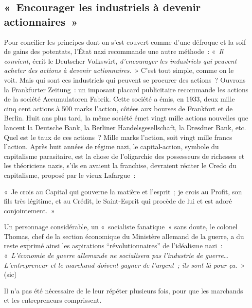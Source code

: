 \documentclass[french,twoside]{book} %
\newenvironment{quoteblock}%
  {\begin{quoting}}
  {\end{quoting}}
\newenvironment{quotebar}{%
    \def\FrameCommand{{\color{rubric!10!}\vrule width 0.5em} \hspace{0.9em}}%
    \def\OuterFrameSep{\itemsep} %
    \MakeFramed {\advance\hsize-\width \FrameRestore}
  }%
  {%
    \endMakeFramed
  }
\renewenvironment{quoteblock}%
  {%
    \savenotes
    \setstretch{0.9}
    \normalfont
    \begin{quotebar}
  }
  {%
    \end{quotebar}
    \spewnotes
  }
\begin{document}
\subsection[« Encourager les industriels à devenir actionnaires »]{« Encourager les industriels à devenir actionnaires »}
\noindent Pour concilier les principes dont on s’est couvert comme d’une défroque et la soif de gains des potentats, l’État nazi recommande une autre méthode : « \emph{Il convient}, écrit le Deutscher Volkswirt, \emph{d’encourager les industriels qui peuvent acheter des actions à devenir actionnaires.} » C’est tout simple, comme on le voit. Mais qui sont ces industriels qui peuvent se procurer des actions ? Ouvrons la Frankfurter Zeitung : un imposant placard publicitaire recommande les actions de la société Accumulatoren Fabrik. Cette société a émis, en 1933, deux mille cinq cent actions à 500 marks l’action, côtées aux bourses de Frankfort et de Berlin. Huit ans plus tard, la même société émet vingt mille actions nouvelles que lancent la Deutsche Bank, la Berliner Handelsgesellschaft, la Dresdner Bank, etc. Quel est le taux de ces actions ? Mille marks l’action, soit vingt mille francs l’action. Après huit années de régime nazi, le capital-action, symbole du capitalisme parasitaire, est la chose de l’oligarchie des possesseurs de richesses et les théoriciens nazis, s’ils en avaient la franchise, devraient réciter le Credo du capitalisme, proposé par le vieux Lafargue :\par

\begin{quoteblock}
 \noindent « Je crois au Capital qui gouverne la matière et l’esprit ; je crois au Profit, son fils très légitime, et au Crédit, le Saint-Esprit qui procède de lui et est adoré conjointement. »
 \end{quoteblock}

\noindent Un personnage considérable, un « socialiste fanatique » sans doute, le colonel Thomas, chef de la section économique du Ministère allemand de la guerre, a du reste exprimé ainsi les aspirations “révolutionnaires” de l’idéalisme nazi : « \emph{L’économie de guerre allemande ne socialisera pas l’industrie de guerre… L’entrepreneur et le marchand doivent gagner de l’argent ; ils sont là pour ça.} » (sic)\par
Il n’a pas été nécessaire de le leur répéter plusieurs fois, pour que les marchands et les entrepreneurs comprissent.
\end{document}

